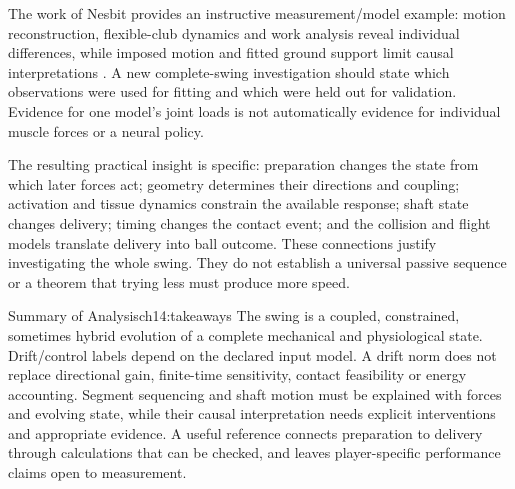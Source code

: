 The work of Nesbit provides an instructive measurement/model example: motion reconstruction, flexible-club dynamics and work analysis reveal individual differences, while imposed motion and fitted ground support limit causal interpretations \citep{Nesbit2005}. A new complete-swing investigation should state which observations were used for fitting and which were held out for validation. Evidence for one model's joint loads is not automatically evidence for individual muscle forces or a neural policy.

The resulting practical insight is specific: preparation changes the state from which later forces act; geometry determines their directions and coupling; activation and tissue dynamics constrain the available response; shaft state changes delivery; timing changes the contact event; and the collision and flight models translate delivery into ball outcome. These connections justify investigating the whole swing. They do not establish a universal passive sequence or a theorem that trying less must produce more speed.

\begin{principle}{Summary of Analysis}{ch14:takeaways}
The swing is a coupled, constrained, sometimes hybrid evolution of a complete mechanical and physiological state. Drift/control labels depend on the declared input model. A drift norm does not replace directional gain, finite-time sensitivity, contact feasibility or energy accounting. Segment sequencing and shaft motion must be explained with forces and evolving state, while their causal interpretation needs explicit interventions and appropriate evidence. A useful reference connects preparation to delivery through calculations that can be checked, and leaves player-specific performance claims open to measurement.
\end{principle}

